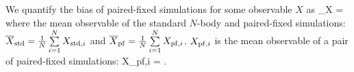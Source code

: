 We quantify the bias of paired-fixed simulations for some observable $X$ as
\beq
\beta_X = 
\eeq
where the mean observable of the standard $N$-body and paired-fixed 
simulations: $\overline{X}_{\rm std} = \frac{1}{N}\sum\limits_{i=1}^{N} X_{{\rm std}, i}$ 
and $\overline{X}_{\rm pf} = \frac{1}{N}\sum\limits_{i=1}^{N} X_{{\rm pf}, i}$. 
$X_{{\rm pf},i}$ is the mean observable of a pair of paired-fixed simulations: 
\beq
X_{{\rm pf},i} =  \big[ X_{{\rm pf},i}^{(1)} + X_{{\rm pf},i}^{(2)}\big].
\eeq



